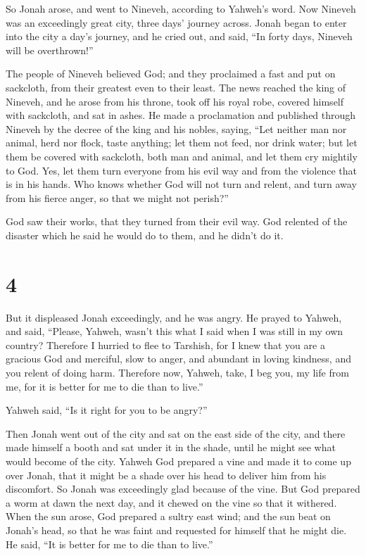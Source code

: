 So Jonah arose, and went to Nineveh, according to Yahweh's
word. Now Nineveh was an exceedingly great city, three days' journey
across.  Jonah began to enter into the city a day's journey,
and he cried out, and said, ``In forty days, Nineveh will be
overthrown!''

 The people of Nineveh believed God; and they proclaimed a
fast and put on sackcloth, from their greatest even to their least.
 The news reached the king of Nineveh, and he arose from his
throne, took off his royal robe, covered himself with sackcloth, and sat
in ashes.  He made a proclamation and published through
Nineveh by the decree of the king and his nobles, saying, ``Let neither
man nor animal, herd nor flock, taste anything; let them not feed, nor
drink water;  but let them be covered with sackcloth, both
man and animal, and let them cry mightily to God. Yes, let them turn
everyone from his evil way and from the violence that is in his hands.
 Who knows whether God will not turn and relent, and turn
away from his fierce anger, so that we might not perish?''

 God saw their works, that they turned from their evil way.
God relented of the disaster which he said he would do to them, and he
didn't do it.

\hypertarget{section-3}{%
\section{4}\label{section-3}}

 But it displeased Jonah exceedingly, and he was angry.
 He prayed to Yahweh, and said, ``Please, Yahweh, wasn't
this what I said when I was still in my own country? Therefore I hurried
to flee to Tarshish, for I knew that you are a gracious God and
merciful, slow to anger, and abundant in loving kindness, and you relent
of doing harm.  Therefore now, Yahweh, take, I beg you, my
life from me, for it is better for me to die than to live.''

 Yahweh said, ``Is it right for you to be angry?''

 Then Jonah went out of the city and sat on the east side of
the city, and there made himself a booth and sat under it in the shade,
until he might see what would become of the city.  Yahweh
God prepared a vine and made it to come up over Jonah, that it might be
a shade over his head to deliver him from his discomfort. So Jonah was
exceedingly glad because of the vine.  But God prepared a
worm at dawn the next day, and it chewed on the vine so that it
withered.  When the sun arose, God prepared a sultry east
wind; and the sun beat on Jonah's head, so that he was faint and
requested for himself that he might die. He said, ``It is better for me
to die than to live.''

